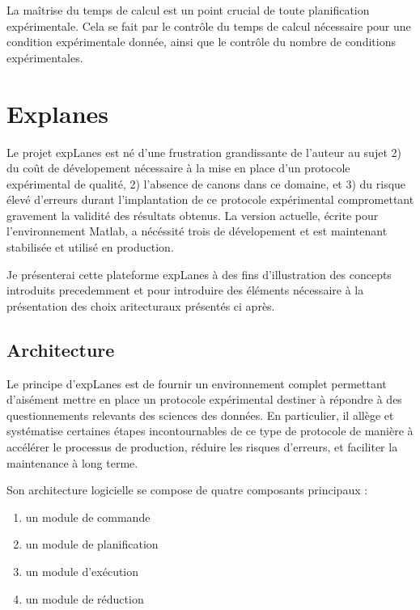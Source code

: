 La maîtrise du temps de calcul est un point crucial de toute planification expérimentale. Cela se fait par le contrôle du temps de calcul nécessaire pour une condition expérimentale donnée, ainsi que le contrôle du nombre de conditions expérimentales.

\section{ \nmu Explanes} \label{sec:explanes}

Le projet expLanes est né d'une frustration grandissante de l'auteur au sujet 2) du coût de dévelopement nécessaire à la mise en place d'un protocole expérimental de qualité, 2) l'absence de canons dans ce domaine, et 3) du risque élevé d'erreurs durant l'implantation de ce protocole expérimental compromettant gravement la validité des résultats obtenus. La version actuelle, écrite pour l'environnement Matlab, a nécéssité trois de dévelopement et est maintenant stabilisée et utilisé en production.

Je présenterai cette plateforme expLanes à des fins d'illustration des concepts introduits precedemment et pour introduire des éléments nécessaire à la présentation des choix aritecturaux présentés ci après.

\subsection{Architecture}

Le principe d'expLanes est de fournir un environnement complet permettant d'aisément mettre en place un protocole expérimental destiner à répondre à des questionnements relevants des sciences des données. En particulier, il allège et systématise certaines étapes incontournables de ce type de protocole de manière à accélérer le processus de production, réduire les risques d'erreurs, et faciliter la maintenance à long terme.

Son architecture logicielle se compose de quatre composants principaux :
\begin{enumerate}
  \item un module de commande
  \item un module de planification
  \item un module d'exécution
  \item un module de réduction
\end{enumerate}

